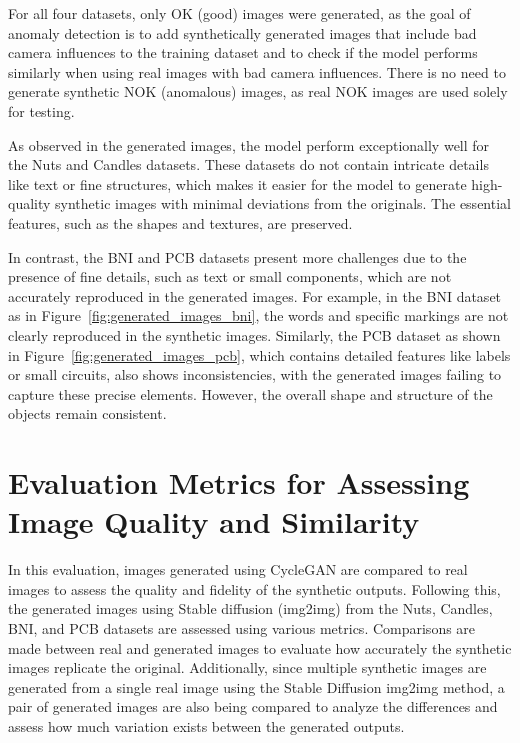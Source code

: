 \documentclass[12pt,DIV14,BCOR12mm,a4paper,footinclude=false,headinclude,parskip=half-,twoside,openright,cleardoublepage=empty,toc=index,bibliography=totoc,listof=totoc]{scrreprt}
\numberwithin{equation}{chapter}
\begin{document}
For all four datasets, only OK (good) images were generated, as the goal of anomaly detection is to add synthetically generated images that include bad camera influences to the training dataset and to check if the model performs similarly when using real images with bad camera influences. There is no need to generate synthetic NOK (anomalous) images, as real NOK images are used solely for testing.

As observed in the generated images, the model perform exceptionally well for the Nuts and Candles datasets. These datasets do not contain intricate details like text or fine structures, which makes it easier for the model to generate high-quality synthetic images with minimal deviations from the originals. The essential features, such as the shapes and textures, are preserved.

In contrast, the BNI and PCB datasets present more challenges due to the presence of fine details, such as text or small components, which are not accurately reproduced in the generated images. For example, in the BNI dataset as in Figure~\ref{fig:generated_images_bni}, the words and specific markings are not clearly reproduced in the synthetic images. Similarly, the PCB dataset as shown in Figure~\ref{fig:generated_images_pcb}, which contains detailed features like labels or small circuits, also shows inconsistencies, with the generated images failing to capture these precise elements. However, the overall shape and structure of the objects remain consistent.

\section{Evaluation Metrics for Assessing Image Quality and Similarity}

In this evaluation, images generated using CycleGAN are compared to real images to assess the quality and fidelity of the synthetic outputs. Following this, the generated images using Stable diffusion (img2img) from the Nuts, Candles, BNI, and PCB datasets are assessed using various metrics. Comparisons are made between real and generated images to evaluate how accurately the synthetic images replicate the original. Additionally, since multiple synthetic images are generated from a single real image using the Stable Diffusion img2img method, a pair of generated images are also being compared to analyze the differences and assess how much variation exists between the generated outputs. 
\end{document}
